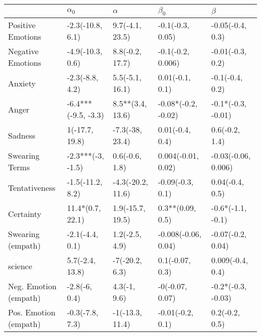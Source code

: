 \begin{tabular}{lllll}
\toprule
{} &           $\alpha_0$ &           $\alpha$ &            $\beta_0$ &              $\beta$ \\
\midrule
Positive Emotions     &     -2.3(-10.8, 6.1) &    9.7(-4.1, 23.5) &     -0.1(-0.3, 0.05) &     -0.05(-0.4, 0.3) \\
Negative Emotions     &     -4.9(-10.3, 0.6) &    8.8(-0.2, 17.7) &    -0.1(-0.2, 0.006) &     -0.01(-0.3, 0.2) \\
Anxiety               &      -2.3(-8.8, 4.2) &    5.5(-5.1, 16.1) &      0.01(-0.1, 0.1) &      -0.1(-0.4, 0.2) \\
Anger                 &  -6.4***(-9.5, -3.3) &   8.5**(3.4, 13.6) &  -0.08*(-0.2, -0.02) &   -0.1*(-0.3, -0.01) \\
Sadness               &       1(-17.7, 19.8) &    -7.3(-38, 23.4) &      0.01(-0.4, 0.4) &       0.6(-0.2, 1.4) \\
Swearing Terms        &    -2.3***(-3, -1.5) &     0.6(-0.6, 1.8) &   0.004(-0.01, 0.02) &  -0.03(-0.06, 0.006) \\
Tentativeness         &     -1.5(-11.2, 8.2) &  -4.3(-20.2, 11.6) &     -0.09(-0.3, 0.1) &      0.04(-0.4, 0.5) \\
Certainty             &     11.4*(0.7, 22.1) &   1.9(-15.7, 19.5) &     0.3**(0.09, 0.5) &    -0.6*(-1.1, -0.1) \\
Swearing (empath)     &      -2.1(-4.4, 0.1) &     1.2(-2.5, 4.9) &  -0.008(-0.06, 0.04) &    -0.07(-0.2, 0.04) \\
science               &      5.7(-2.4, 13.8) &     -7(-20.2, 6.3) &      0.1(-0.07, 0.3) &     0.009(-0.4, 0.4) \\
Neg. Emotion (empath) &        -2.8(-6, 0.4) &       4.3(-1, 9.6) &      -0(-0.07, 0.07) &   -0.2*(-0.3, -0.03) \\
Pos. Emotion (empath) &      -0.3(-7.8, 7.3) &    -1(-13.3, 11.4) &     -0.01(-0.2, 0.1) &       0.2(-0.2, 0.5) \\
\bottomrule
\end{tabular}
